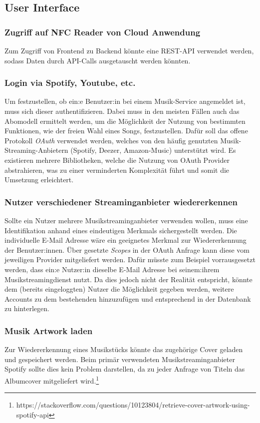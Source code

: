 \documentclass[10pt, a4paper]{article}
\begin{document}
\begin{onehalfspace}
\subsection{User Interface}
\subsubsection*{Zugriff auf NFC Reader von Cloud Anwendung}
Zum Zugriff von Frontend zu Backend könnte eine REST-API verwendet werden, sodass Daten durch API-Calls ausgetauscht werden könnten.

\subsubsection*{Login via Spotify, Youtube, etc.}
Um festzustellen, ob ein:e Benutzer:in bei einem Musik-Service angemeldet ist, muss sich dieser authentifizieren. Dabei muss in den meisten Fällen auch das Abomodell ermittelt werden, um die Möglichkeit der Nutzung von bestimmten Funktionen, wie der freien Wahl eines Songs, festzustellen. Dafür soll das offene Protokoll \textit{OAuth} verwendet werden, welches von den häufig genutzten Musik-Streaming-Anbietern (Spotify, Deezer, Amazon-Music) unterstützt wird.
Es existieren mehrere Bibliotheken, welche die Nutzung von OAuth Provider abstrahieren, was zu einer verminderten Komplexität führt und somit die Umsetzung erleichtert.

\subsubsection*{Nutzer verschiedener Streaminganbieter wiedererkennen}
Sollte ein Nutzer mehrere Musikstreaminganbieter verwenden wollen, muss eine Identifikation anhand eines eindeutigen Merkmals sichergestellt werden.
Die individuelle E-Mail Adresse wäre ein geeignetes Merkmal zur Wiedererkennung der Benutzer:innen.
Über gesetzte \textit{Scopes} in der OAuth Anfrage kann diese vom jeweiligen Provider mitgeliefert werden.
Dafür müsste zum Beispiel vorrausgesetzt werden, dass ein:e Nutzer:in dieselbe E-Mail Adresse bei seinem:ihrem Musikstreamingdienst nutzt.
Da dies jedoch nicht der Realität entspricht, könnte dem (bereits eingeloggten) Nutzer die Möglichkeit gegeben werden, weitere Accounts zu dem bestehenden hinzuzufügen und entsprechend in der Datenbank zu hinterlegen.

\subsubsection*{Musik Artwork laden}
Zur Wiedererkennung eines Musikstücks könnte das zugehörige Cover geladen und gespeichert werden.
Beim primär verwendeten Musikstreaminganbieter Spotify sollte dies kein Problem darstellen, da zu jeder Anfrage von Titeln das Albumcover mitgeliefert wird.\footnote{https://stackoverflow.com/questions/10123804/retrieve-cover-artwork-using-spotify-api}


\end{onehalfspace}
\end{document}
